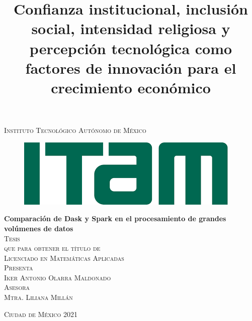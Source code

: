 \documentclass[11pt, oneside]{book}
\begin{document}

\title{Confianza institucional, inclusión social, intensidad religiosa y percepción tecnológica como factores de innovación para el crecimiento económico} %

\begin{titlepage}
\begin{center}

\textsc{\Large Instituto Tecnológico Autónomo de México}\\[2em]

\begin{figure}[h]
\begin{center}
\includegraphics[scale=0.50]{itam_logo.png}
\end{center}
\end{figure}


\textbf{\LARGE Comparación de Dask y Spark en el procesamiento de grandes volúmenes de datos}\\[2em]

\textsc{\large Tesis}\\[1em]

\textsc{\large que para obtener el título de}\\[1em]

\textsc{\LARGE Licenciado en Matemáticas Aplicadas}\\[1em]

\textsc{\large Presenta}\\[1em]

\textsc{\LARGE Iker Antonio Olarra Maldonado}\\[1em]

\textsc{\large Asesora}\\[1em]

\textsc{\LARGE Mtra. Liliana Millán}\\[2em]


\end{center}

\vspace*{\fill}
\textsc{Ciudad de México \hspace*{\fill} 2021}

\end{titlepage}
\end{document}
